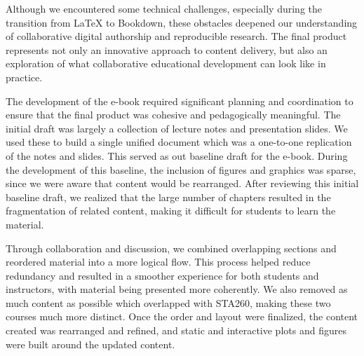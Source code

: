 \documentclass[11pt]{article}
\begin{document}
Although we encountered some technical challenges, especially during the transition from LaTeX to Bookdown, these obstacles deepened our understanding of collaborative digital authorship and reproducible research. The final product represents not only an innovative approach to content delivery, but also an exploration of what collaborative educational development can look like in practice.


The development of the e-book required significant planning and coordination to ensure that the final product was cohesive and pedagogically meaningful. The initial draft was largely a collection of lecture notes and presentation slides. 
We used these to build a single unified document which was a one-to-one replication of the notes and slides.
This served as out baseline draft for the e-book.
During the development of this baseline, the inclusion of figures and graphics was sparse, since we were aware that content would be rearranged.
After reviewing this initial baseline draft, we realized that the large number of chapters resulted in the fragmentation of related content, making it difficult for students to learn the material.

Through collaboration and discussion, we combined overlapping sections and reordered material into a more logical flow. 
This process helped reduce redundancy and resulted in a smoother experience for both students and instructors, with material being presented more coherently.
We also removed as much content as possible which overlapped with STA260, making these two courses much more distinct.
Once the order and layout were finalized, the content created was rearranged and refined, and static and interactive plots and figures were built around the updated content.
\end{document}
